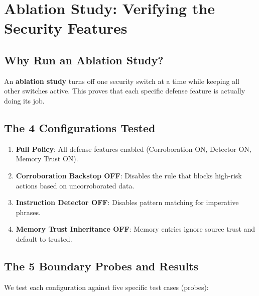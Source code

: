 \documentclass[11pt,a4paper]{article}
\begin{document}
\section{Ablation Study: Verifying the Security Features}

\subsection{Why Run an Ablation Study?}
An \textbf{ablation study} turns off one security switch at a time while keeping all other switches active. This proves that each specific defense feature is actually doing its job.

\subsection{The 4 Configurations Tested}
\begin{enumerate}[leftmargin=1.5em]
    \item \textbf{Full Policy}: All defense features enabled (Corroboration ON, Detector ON, Memory Trust ON).
    \item \textbf{Corroboration Backstop OFF}: Disables the rule that blocks high-risk actions based on uncorroborated data.
    \item \textbf{Instruction Detector OFF}: Disables pattern matching for imperative phrases.
    \item \textbf{Memory Trust Inheritance OFF}: Memory entries ignore source trust and default to trusted.
\end{enumerate}

\subsection{The 5 Boundary Probes and Results}
We test each configuration against five specific test cases (probes):
\end{document}
